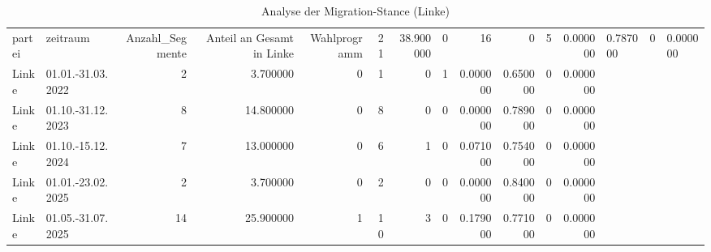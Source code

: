 \begin{table}
\caption{Analyse der Migration-Stance (Linke)}
\label{tab:meine_tabelle}
\begin{tabular}{llrrrrrrrrrr}
\toprule
partei & zeitraum & Anzahl_Segmente & Anteil an Gesamt in %
\midrule
Linke & Wahlprogramm & 21 & 38.900000 & 0 & 16 & 0 & 5 & 0.000000 & 0.787000 & 0 & 0.000000 \\
Linke & 01.01.-31.03.2022 & 2 & 3.700000 & 0 & 1 & 0 & 1 & 0.000000 & 0.650000 & 0 & 0.000000 \\
Linke & 01.10.-31.12.2023 & 8 & 14.800000 & 0 & 8 & 0 & 0 & 0.000000 & 0.789000 & 0 & 0.000000 \\
Linke & 01.10.-15.12.2024 & 7 & 13.000000 & 0 & 6 & 1 & 0 & 0.071000 & 0.754000 & 0 & 0.000000 \\
Linke & 01.01.-23.02.2025 & 2 & 3.700000 & 0 & 2 & 0 & 0 & 0.000000 & 0.840000 & 0 & 0.000000 \\
Linke & 01.05.-31.07.2025 & 14 & 25.900000 & 1 & 10 & 3 & 0 & 0.179000 & 0.771000 & 0 & 0.000000 \\
\bottomrule
\end{tabular}
\end{table}
